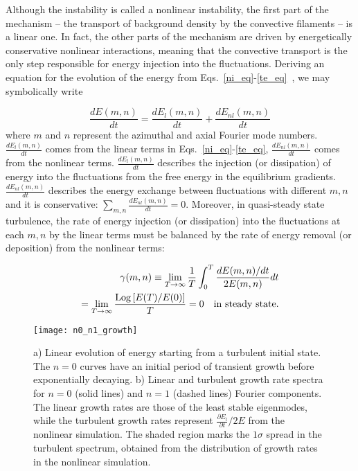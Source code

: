 \documentclass[letter,scriptaddress,twocolumn, prl,showkeys]{revtex4}
\def\beq{\begin{equation}}
\def\eeq{\end{equation}}
\def\beqar{\begin{eqnarray}}
\def\eeqar{\end{eqnarray}}
\newcommand{\diff}[2]{\frac{d#1}{d#2}}
\newcommand{\pdiff}[2]{\frac{\partial#1}{\partial#2}}
\begin{document}
Although the instability is called a nonlinear instability, the first part of the mechanism -- the transport of background density by the convective filaments -- is a linear one.
In fact, the other parts of the mechanism are driven by energetically conservative nonlinear interactions, 
meaning that the convective transport is the only step responsible for energy injection into the fluctuations.
Deriving an equation for the evolution of the energy from Eqs.~\ref{ni_eq}-\ref{te_eq}~\cite{friedman2012b,friedman2013}, we may symbolically write

\beq
\label{dEdt_def}
\diff{E(m,n)}{t} = \diff{E_{l}(m,n)}{t} + \diff{E_{nl}(m,n)}{t}
\eeq
where $m$ and $n$ represent the azimuthal and axial Fourier mode numbers. 
$\diff{E_{l}(m,n)}{t}$ comes from the linear terms in Eqs.~\ref{ni_eq}-\ref{te_eq}, $\diff{E_{nl}(m,n)}{t}$ comes from the nonlinear terms. 
$\diff{E_{l}(m,n)}{t}$ describes the injection (or dissipation) of energy into the fluctuations from the free energy in the equilibrium gradients.
$\diff{E_{nl}(m,n)}{t}$ describes the energy exchange between fluctuations with different $m,n$ and it is conservative: $\sum_{m,n} \diff{E_{nl}(m,n)}{t} = 0$.
Moreover, in quasi-steady state turbulence, the rate of energy injection (or dissipation) into the fluctuations at each $m,n$ by the linear terms must be balanced by
the rate of energy removal (or deposition) from the nonlinear terms:

\beqar
\label{steady_state}
\gamma(m,n) \equiv  \displaystyle\lim_{T \to \infty} \frac{1}{T} \int_0^T \frac{dE(m,n)/dt}{2 E(m,n)} dt \nonumber \\
= \displaystyle\lim_{T \to \infty} \frac{{\rm{Log}}\left[ E(T)/E(0) \right]}{T} = 0 \quad {\rm{in \ steady \ state}}.
\eeqar

\begin{figure}
\centerline{\texttt{[image: n0\_n1\_growth]}}
\caption{a) Linear evolution of energy starting from a turbulent initial state. The $n=0$ curves have an initial period of transient growth before exponentially decaying.
b) Linear and turbulent growth rate spectra for $n=0$ (solid lines) and $n=1$ (dashed lines) Fourier components. The linear growth rates are those of the least stable eigenmodes,
while the turbulent growth rates represent $\pdiff{E_l}{t}/2 E$ from the nonlinear simulation. The shaded region marks the $1 \sigma$ spread in the turbulent spectrum,
obtained from the distribution of growth rates in the nonlinear simulation.}
\label{n0_n1_growth}
\end{figure}
\end{document}
